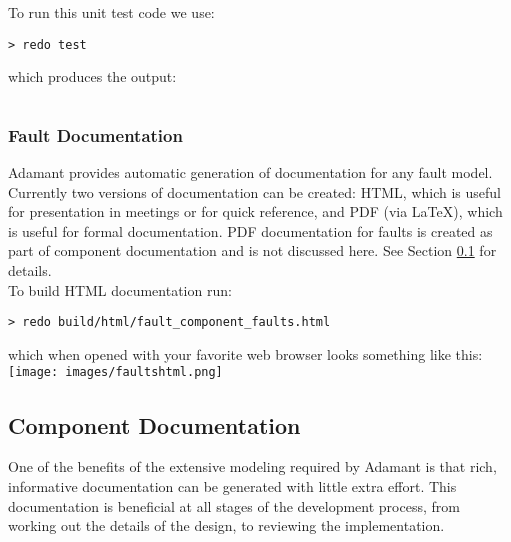 To run this unit test code we use:

\vspace{5mm} %
\begin{verbatim}
> redo test
\end{verbatim}
\vspace{5mm} %

which produces the output:

\vspace{5mm} %
\inputminted{text}{../example_architecture/event_component/test/output.txt}
\vspace{5mm} %

\subsubsection{Fault Documentation}

Adamant provides automatic generation of documentation for any fault model. Currently two versions of documentation can be created: HTML, which is useful for presentation in meetings or for quick reference, and PDF (via \LaTeX), which is useful for formal documentation. PDF documentation for faults is created as part of component documentation and is not discussed here. See Section \ref{Component Documentation} for details. \\

To build HTML documentation run:

\vspace{5mm} %
\begin{verbatim}
> redo build/html/fault_component_faults.html
\end{verbatim}
\vspace{5mm} %

which when opened with your favorite web browser looks something like this: \\

\vspace{5mm} %
\texttt{[image: images/faultshtml.png]}
\vspace{5mm} %

\subsection{Component Documentation} \label{Component Documentation}

One of the benefits of the extensive modeling required by Adamant is that rich, informative documentation can be generated with little extra effort. This documentation is beneficial at all stages of the development process, from working out the details of the design, to reviewing the implementation. \\

